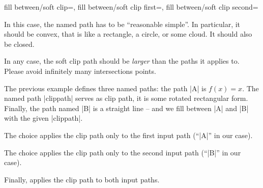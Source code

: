 \begin{tikzkeylist}{%
    fill between/soft clip=,
    fill between/soft clip first=,
    fill between/soft clip second=%
}
\begin{itemize}
            In this case, the named path has to be ``reasonable simple''. In
            particular, it should be convex, that is like a rectangle, a
            circle, or some cloud. It should also be closed.
    \end{itemize}
    In any case, the soft clip path should be \emph{larger} than the paths it
    applies to. Please avoid infinitely many intersections points.
\begin{codeexample}[]
\end{codeexample}
    \noindent The previous example defines three named paths: the path |A| is
    $f(x) = x$. The named path |clippath| serves as clip path, it is some
    rotated rectangular form. Finally, the path named |B| is a straight line --
    and we fill between |A| and |B| with the given |clippath|.

    The choice  applies the clip path only to
    the first input path (``|A|'' in our case).

    The choice  applies the clip path only to
    the second input path (``|B|'' in our case).

    Finally,  applies the clip path to both input
    paths.
\begin{codeexample}[]
\end{codeexample}


\end{tikzkeylist}
